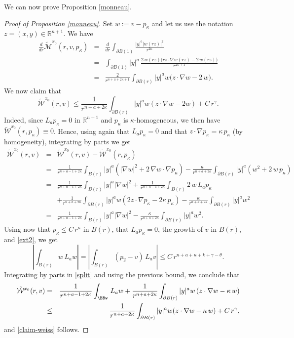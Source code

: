 \documentclass[11pt]{amsart}
\theoremstyle{plain}
\numberwithin{equation}{section}
\begin{document}
We can now prove Proposition \ref{monneau}.

\begin{proof}[Proof of Proposition \ref{monneau}]
Set $w:=v-p_\kappa$ and let us use the notation $z=(x,y) \in {\mathbb R}^{n+1}$.
We have
\begin{eqnarray}
\frac{d}{dr}\tilde{\mathcal{M}}^{x_0}(r,v, p_{\kappa})&=&\frac{d}{dr}\int_{\partial {B(1)}}\frac{|y|^{a}|w(rz)|^2}{r^{2\kappa}}\nonumber\\
&=&\int_{\partial {B(1)}}|y|^{a}\,\frac{2\,w(rz)\bigl(rz\cdot\nabla w(rz)-2\,w(rz)\bigr)}{r^{2\kappa+1}} \nonumber\\
&=&\frac{2}{r^{n+a+2\kappa+1}}\int_{\partial {B(r)}}|y|^{a}w\bigl(z\cdot\nabla w-2\,w\bigr).\label{d dr M}
\end{eqnarray}
We now claim that
\begin{equation}\label{claim-weiss}
\tilde{\mathcal{W}}^{x_0}(r,v)\leq  \frac{1}{r^{n+a+2\kappa}}\int_{\partial {B(r)}}|y|^{a}w(z\cdot \nabla w-2w)+C\,r^{\gamma}.
\end{equation}
Indeed, since $L_ap_{\kappa}=0$ in ${\mathbb R}^{n+1}$ and $p_{\kappa}$ is $\kappa$-homogeneous,
we then have $\tilde{\mathcal{W}}^{x_0}(r,p_{\kappa})\equiv0$.
Hence, using again that $L_ap_{\kappa}=0$ and that $z\cdot \nabla p_{\kappa}=\kappa\,p_{\kappa}$ (by homogeneity), integrating by parts we get
\begin{eqnarray}
\tilde{\mathcal{W}}^{x_0}(r,v)&=&\tilde{\mathcal{W}}^{x_0}(r,v)-\tilde{\mathcal{W}}^{x_0}(r,p_{\kappa}) \nonumber\\
&=&\frac{1}{r^{n+a-1+2\kappa}}\int_{B(r)}|y|^{a}\left(|\nabla w|^2+2\,\nabla w\cdot\nabla p_{\kappa}\right)
        -\frac{\kappa}{r^{n+a+2\kappa}}\int_{\partial {B(r)}}|y|^{a}\left(w^2+2\,w\,p_{\kappa}\right)\nonumber\\
&=&\frac{1}{r^{n+a-1+2\kappa}}\int_{B(r)}|y|^{a}|\nabla w|^2
        +\frac{1}{r^{n+a-1+2\kappa}}\int_{B(r)}2\,w\,L_ap_{\kappa}\nonumber\\
&& +\frac{1}{r^{n+a+2\kappa}}\int_{\partial {B(r)}}|y|^{a}w\left(2z\cdot \nabla p_{\kappa}-2\kappa\,p_{\kappa}\right)
        -\frac{\kappa}{r^{n+a+2\kappa}}\int_{\partial {B(r)}}|y|^{a}w^2\nonumber\\
&=&\frac{1}{r^{n+a-1+2\kappa}}\int_{B(r)}|y|^{a}|\nabla w|^2
        -\frac{\kappa}{r^{n+a+2\kappa}}\int_{\partial {B(r)}}|y|^{a}w^2.
\label{split}
\end{eqnarray}
Using now that $p_{\kappa}\leq C\,r^{\kappa}$ in ${B(r)}$, that $L_ap_{\kappa}=0$, the growth of $v$ in ${B(r)}$, and \eqref{ext2}, we get
\[\left|\int_{B(r)}{w\, L_a w}\right|=\left|\int_{B(r)}{(p_2-v)\, L_a v}\right|\leq C\, r^{n+a+\kappa+k+\gamma-\theta}.\]
Integrating by parts in \eqref{split} and using the previous bound, we conclude that
\begin{eqnarray*}
\tilde{\mathcal{W}}^{x_0}(r,v)&=&\frac{1}{r^{n+a-1+2\kappa}}\int_\BBw\,L_aw
                            +\frac{1}{r^{n+a+2\kappa}}\int_{\partial {B(r)}}|y|^{a}w\,(z\cdot \nabla w-\kappa\,w)\\
&\leq& \frac{1}{r^{n+a+2\kappa}}\int_{\partial {B(r)}}|y|^{a}w(z\cdot \nabla w-\kappa\, w)+ C\,r^{\gamma},
\end{eqnarray*}
and \eqref{claim-weiss} follows.


\end{proof}
\end{document}
